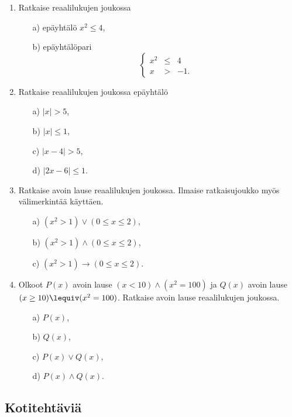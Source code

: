 \begin{enumerate}
\item
Ratkaise reaalilukujen joukossa
\begin{itemize}
\item[a)] epäyhtälö $x^2 \le 4$,
\item[b)] epäyhtälöpari
\[
\left\{
\begin{array}{rcl}
x^2 & \le & 4 \\
x & > & -1.
\end{array}\right.
\]
\end{itemize}

\item
Ratkaise reaalilukujen joukossa epäyhtälö
\begin{itemize}
\item[a)] $|x| > 5$,
\item[b)] $|x| \le 1$,
\item[c)] $|x - 4| > 5$,
\item[d)] $|2x - 6| \le 1$.
\end{itemize}

\item Ratkaise avoin lause reaalilukujen joukossa. Ilmaise ratkaisujoukko myös välimerkintää käyttäen.
\begin{itemize}
\item[a)] $(x^2 > 1) \lor (0 \le x \le 2)$,
\item[b)] $(x^2 > 1) \land (0 \le x \le 2)$,
\item[c)] $(x^2 > 1) \to (0 \le x \le 2)$.
\end{itemize}

\item
Olkoot $P(x)$ avoin lause $(x < 10) \land (x^2 = 100)$ ja
$Q(x)$ avoin lause $(x \ge 10) \lequiv (x^2 = 100)$. Ratkaise avoin lause reaalilukujen joukossa.
\begin{itemize}
\item[a)] $P(x)$,
\item[b)] $Q(x)$,
\item[c)] $P(x) \lor Q(x)$,
\item[d)] $P(x) \land Q(x)$.
\end{itemize}


\end{enumerate}

\subsection*{Kotitehtäviä}

